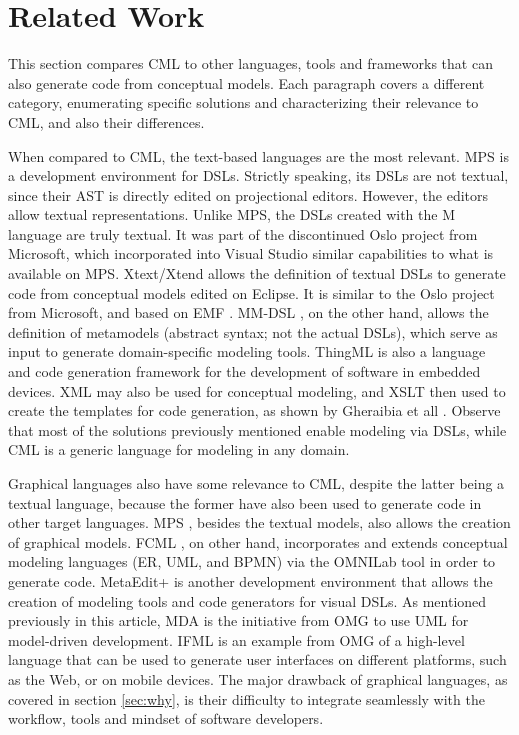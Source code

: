 \section{Related Work}\label{sec:related}

This section compares CML to other languages, tools and frameworks
that can also generate code from conceptual models.
Each paragraph covers a different category,
enumerating specific solutions and characterizing their relevance to CML,
and also their differences.

When compared to CML, the text-based languages are the most relevant.
MPS \cite{voelter} is a development environment for DSLs.
Strictly speaking, its DSLs are not textual,
since their AST is directly edited on projectional editors.
However, the editors allow textual representations.
Unlike MPS, the DSLs created with the M language \cite{mlang} are truly textual. It was part of the discontinued Oslo project from Microsoft,
which incorporated into Visual Studio similar capabilities to what is available on MPS.
Xtext/Xtend \cite{xtext} allows the definition of textual DSLs
to generate code from conceptual models edited on Eclipse.
It is similar to the Oslo project from Microsoft,
and based on EMF \cite{emf}.
MM-DSL \cite{mm-dsl}, on the other hand,
allows the definition of metamodels (abstract syntax; not the actual DSLs),
which serve as input to generate domain-specific modeling tools.
ThingML \cite{thingml} is also a language and code generation framework for
the development of software in embedded devices.
XML may also be used for conceptual modeling,
and XSLT then used to create the templates for code generation,
as shown by Gheraibia et all \cite{xslt}.
Observe that most of the solutions previously mentioned enable modeling via DSLs,
while CML is a generic language for modeling in any domain.

Graphical languages also have some relevance to CML,
despite the latter being a textual language,
because the former have also been used to generate code in other target languages.
MPS \cite{voelter},
besides the textual models,
also allows the creation of graphical models.
FCML \cite{fcml}, on other hand,
incorporates and extends conceptual modeling languages (ER, UML, and BPMN)
via the OMNILab tool in order to generate code.
MetaEdit+ \cite{metaedit} is another development environment
that allows the creation of modeling tools
and code generators for visual DSLs.
As mentioned previously in this article,
MDA \cite{mda} is the initiative from OMG
to use UML \cite{uml} for model-driven development.
IFML \cite{ifml} is an example from OMG of a high-level language
that can be used to generate user interfaces on different platforms,
such as the Web, or on mobile devices.
The major drawback of graphical languages,
as covered in section \ref{sec:why},
is their difficulty to integrate seamlessly with the workflow, tools and mindset of software developers.

